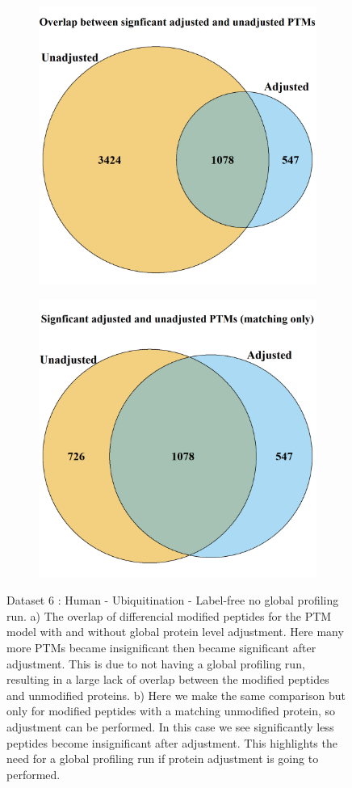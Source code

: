 \documentclass[mcp]{article}
\numberwithin{table}{section}
\begin{document}
\begin{figure}[h!]
\centering
 \begin{subfigure}{\textwidth}
 \centering
	\includegraphics[height=.525\textwidth]{images/usp30_venn_diagramm}
	\caption{}
	\label{fig:data6_vd1}
 \end{subfigure}
 \begin{subfigure}{\textwidth}
 \centering
	\includegraphics[height=.525\textwidth]{images/usp30_venn_diagramm_matching_only}
	\caption{}
	\label{fig:data6_vd2}
 \end{subfigure}
 \caption{Dataset 6 : Human - Ubiquitination - Label-free no global profiling run. a) The overlap of differencial modified peptides for the PTM model with and without global protein level adjustment. Here many more PTMs became insignificant then became significant after adjustment. This is due to not having a global profiling run, resulting in a large lack of overlap between the modified peptides and unmodified proteins. b) Here we make the same comparison but only for modified peptides with a matching unmodified protein, so adjustment can be performed. In this case we see significantly less peptides become insignificant after adjustment. This highlights the need for a global profiling run if protein adjustment is going to performed.}
\label{fig:data6_plots}
\end{figure}
\end{document}
